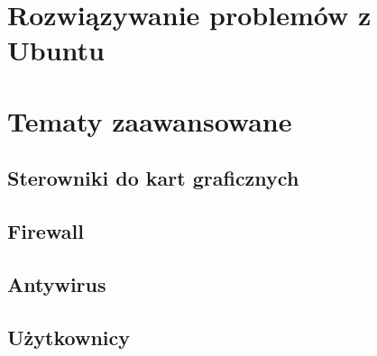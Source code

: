 \documentclass[a4paper,11pt,oneside]{mwart}
\begin{document}
	\section{Rozwiązywanie problemów z Ubuntu}
			
	\section{Tematy zaawansowane}
		\subsection{Sterowniki do kart graficznych}
			
		\subsection{Firewall}
			
		\subsection{Antywirus}
			
		\subsection{Użytkownicy}
			
\end{document}
